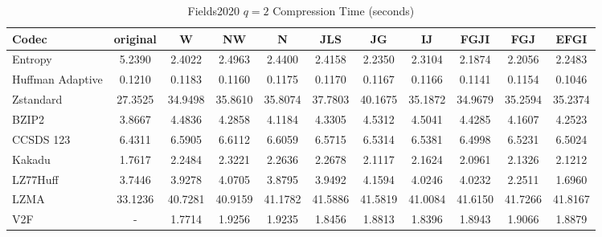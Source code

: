 \documentclass{article}
\begin{document}
\begin{table}[h!]
\centering
\caption{Fields2020 $q=2$ Compression Time (seconds)}
\begin{tabular}{|l|cccccccccc|}
\hline
Codec &  original &       W &      NW &       N &     JLS &      JG &      IJ &    FGJI &     FGJ &    EFGI \\
\hline
Entropy & 5.2390 & 2.4022 & 2.4963 & 2.4400 & 2.4158 & 2.2350 & 2.3104 & 2.1874 & 2.2056 & 2.2483         \\
\hline
Huffman Adaptive &    0.1210 &  0.1183 &  0.1160 &  0.1175 &  0.1170 &  0.1167 &  0.1166 &  0.1141 &  0.1154 &  0.1046 \\
Zstandard        &   27.3525 & 34.9498 & 35.8610 & 35.8074 & 37.7803 & 40.1675 & 35.1872 & 34.9679 & 35.2594 & 35.2374 \\
BZIP2            &    3.8667 &  4.4836 &  4.2858 &  4.1184 &  4.3305 &  4.5312 &  4.5041 &  4.4285 &  4.1607 &  4.2523 \\
CCSDS 123        &    6.4311 &  6.5905 &  6.6112 &  6.6059 &  6.5715 &  6.5314 &  6.5381 &  6.4998 &  6.5231 &  6.5024 \\
Kakadu           &    1.7617 &  2.2484 &  2.3221 &  2.2636 &  2.2678 &  2.1117 &  2.1624 &  2.0961 &  2.1326 &  2.1212 \\
LZ77Huff         &    3.7446 &  3.9278 &  4.0705 &  3.8795 &  3.9492 &  4.1594 &  4.0246 &  4.0232 &  2.2511 &  1.6960 \\
LZMA             &   33.1236 & 40.7281 & 40.9159 & 41.1782 & 41.5886 & 41.5819 & 41.0084 & 41.6150 & 41.7266 & 41.8167 \\
V2F              &    - &  1.7714 &  1.9256 &  1.9235 &  1.8456 &  1.8813 &  1.8396 &  1.8943 &  1.9066 &  1.8879 \\
\hline
\end{tabular}
\end{table}

\newpage
\end{document}

